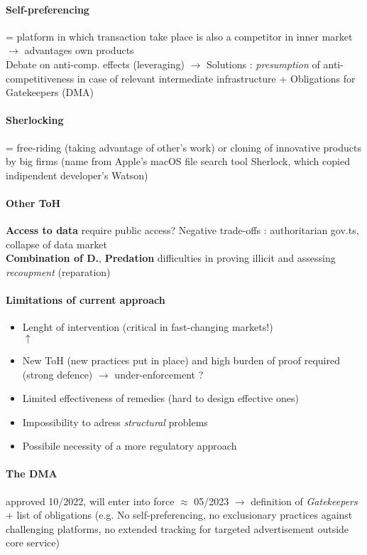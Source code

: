 \documentclass[10pt]{article}
\begin{document}
\paragraph{Self-preferencing} = platform in which transaction take place is also a competitor in inner market $\rightarrow$ advantages own products
\\Debate on anti-comp. effects (leveraging) $\rightarrow$ Solutions : \textit{presumption} of anti-competitiveness in case of relevant intermediate infrastructure + Obligations for Gatekeepers (DMA)

\paragraph{Sherlocking} = free-riding (taking advantage of other's work) or cloning of innovative products by big firms (name from Apple's macOS file search tool Sherlock, which copied indipendent developer's Watson)

\paragraph{Other ToH} \textbf{Access to data} require public access? Negative trade-offs : authoritarian gov.ts, collapse of data market
\\\textbf{Combination of D.}, \textbf{Predation} difficulties in proving illicit and assessing \textit{recoupment} (reparation)

\paragraph{Limitations of current approach}
\begin{itemize}
    \item Lenght of intervention (critical in fast-changing markets!)
    \\ $\uparrow$
    \item New ToH (new practices put in place) and high burden of proof required (strong defence) $\rightarrow$ under-enforcement ?
    \item Limited effectiveness of remedies (hard to design effective ones)
    \item Impossibility to adress \textit{structural} problems
    \item Possibile necessity of a more regulatory approach
\end{itemize}

\paragraph{The DMA} approved 10/2022, will enter into force $\approx$ 05/2023 $\rightarrow$ definition of \textit{Gatekeepers} + list of obligations (e.g. No self-preferencing, no exclusionary practices against challenging platforms, no extended tracking for targeted advertisement outside core service)
\end{document}
